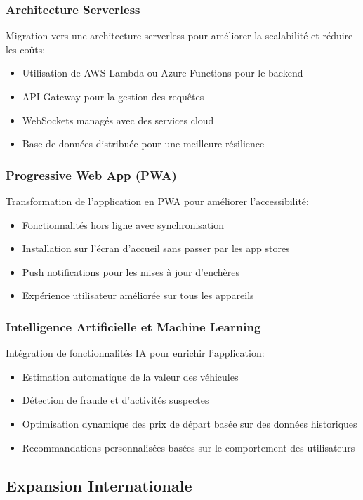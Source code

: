 \subsubsection{Architecture Serverless}
Migration vers une architecture serverless pour améliorer la scalabilité et réduire les coûts:
\begin{itemize}
    \item Utilisation de AWS Lambda ou Azure Functions pour le backend
    \item API Gateway pour la gestion des requêtes
    \item WebSockets managés avec des services cloud
    \item Base de données distribuée pour une meilleure résilience
\end{itemize}

\subsubsection{Progressive Web App (PWA)}
Transformation de l'application en PWA pour améliorer l'accessibilité:
\begin{itemize}
    \item Fonctionnalités hors ligne avec synchronisation
    \item Installation sur l'écran d'accueil sans passer par les app stores
    \item Push notifications pour les mises à jour d'enchères
    \item Expérience utilisateur améliorée sur tous les appareils
\end{itemize}

\subsubsection{Intelligence Artificielle et Machine Learning}
Intégration de fonctionnalités IA pour enrichir l'application:
\begin{itemize}
    \item Estimation automatique de la valeur des véhicules
    \item Détection de fraude et d'activités suspectes
    \item Optimisation dynamique des prix de départ basée sur des données historiques
    \item Recommandations personnalisées basées sur le comportement des utilisateurs
\end{itemize}

\subsection{Expansion Internationale}

